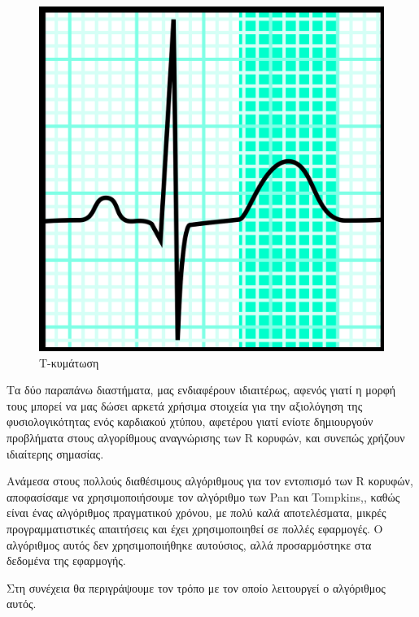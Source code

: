 \begin{figure}[h]
    \centering
    \includegraphics[scale=0.1]{latex_code/Figures_new/t_wave.png}
    \caption{Τ-κυμάτωση}
    \label{fig:t_wave}
\end{figure}

Τα δύο παραπάνω διαστήματα, μας ενδιαφέρουν ιδιαιτέρως, αφενός γιατί η μορφή τους μπορεί να μας δώσει αρκετά χρήσιμα στοιχεία για την αξιολόγηση της φυσιολογικότητας ενός καρδιακού χτύπου, αφετέρου γιατί ενίοτε δημιουργούν προβλήματα στους αλγορίθμους αναγνώρισης των R κορυφών, και συνεπώς χρήζουν ιδιαίτερης σημασίας.

Ανάμεσα στους πολλούς διαθέσιμους αλγόριθμους για τον εντοπισμό των R κορυφών, αποφασίσαμε να χρησιμοποιήσουμε τον αλγόριθμο των Pan και Tompkins,\cite{pan_tompkins}, καθώς είναι ένας αλγόριθμος πραγματικού χρόνου, με πολύ καλά αποτελέσματα, μικρές προγραμματιστικές απαιτήσεις και έχει χρησιμοποιηθεί σε πολλές εφαρμογές. Ο αλγόριθμος αυτός δεν χρησιμοποιήθηκε αυτούσιος, αλλά προσαρμόστηκε στα δεδομένα της εφαρμογής.

Στη συνέχεια θα περιγράψουμε τον τρόπο με τον οποίο λειτουργεί ο αλγόριθμος αυτός.


